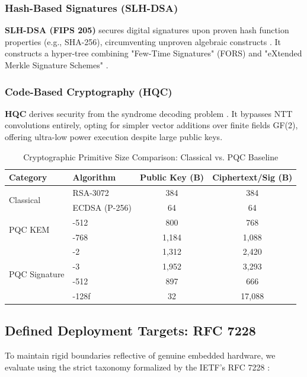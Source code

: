 \subsubsection{Hash-Based Signatures (SLH-DSA)}
\textbf{SLH-DSA (FIPS 205)} secures digital signatures upon proven hash function properties (e.g., SHA-256), circumventing unproven algebraic constructs \cite{bernstein2019sphincs}. It constructs a hyper-tree combining "Few-Time Signatures" (FORS) and "eXtended Merkle Signature Schemes" \cite{bernstein2019sphincs}.

\subsubsection{Code-Based Cryptography (HQC)}
\textbf{HQC} derives security from the syndrome decoding problem \cite{nist2025hqc}. It bypasses NTT convolutions entirely, opting for simpler vector additions over finite fields GF(2), offering ultra-low power execution despite large public keys.

\begin{table}[htbp]
\caption{Cryptographic Primitive Size Comparison: Classical vs. PQC Baseline}
\label{tab:classical_vs_pqc}
\centering
\begin{tabular}{llcc}
\toprule
\textbf{Category} & \textbf{Algorithm} & \textbf{Public Key (B)} & \textbf{Ciphertext/Sig (B)} \\
\midrule
\multirow{2}{*}{Classical} 
& RSA-3072 & 384 & 384 \\
& ECDSA (P-256) & 64 & 64 \\
\midrule
\multirow{2}{*}{PQC KEM} 
& \kyber{}-512 & 800 & 768 \\
& \kyber{}-768 & 1,184 & 1,088 \\
\midrule
\multirow{4}{*}{PQC Signature} 
& \dilithium{}-2 & 1,312 & 2,420 \\
& \dilithium{}-3 & 1,952 & 3,293 \\
& \falcon{}-512 & 897 & 666 \\
& \sphincs{}-128f & 32 & 17,088 \\
\bottomrule
\end{tabular}
\end{table}

\subsection{Defined Deployment Targets: RFC 7228}

To maintain rigid boundaries reflective of genuine embedded hardware, we evaluate using the strict taxonomy formalized by the IETF's RFC 7228 \cite{bormann2014coap}:

